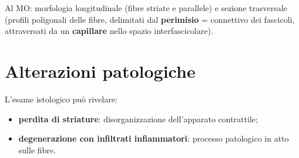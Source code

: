 Al MO: morfologia longitudinale (fibre striate e parallele) e sezione trasversale (profili
poligonali delle fibre, delimitati dal \textbf{perimisio} = connettivo dei fascicoli, attraversati
da un \textbf{capillare} nello spazio interfascicolare).

\section{Alterazioni patologiche}

L'esame istologico può rivelare:
\begin{itemize}
  \item \textbf{perdita di striature}: disorganizzazione dell'apparato contrattile;
  \item \textbf{degenerazione con infiltrati infiammatori}: processo patologico in atto sulle fibre.
\end{itemize}
